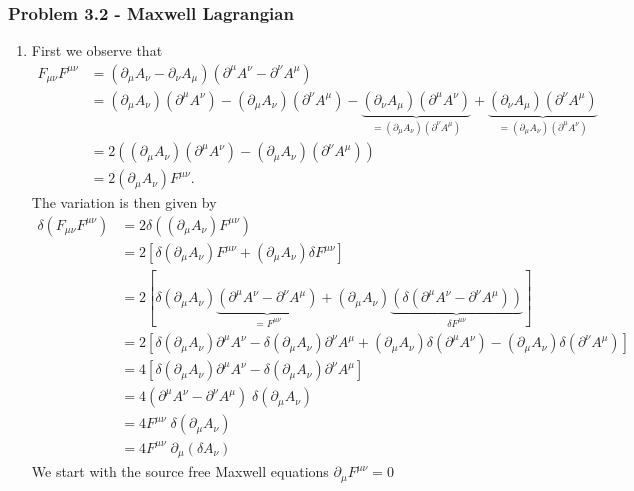 \documentclass[10pt,a4paper]{book}
\theoremstyle{definition}
\begin{document}
\subsubsection{Problem 3.2 - Maxwell Lagrangian}
\begin{enumerate}
    \item First we observe that
    \begin{align}
        F_{\mu\nu}F^{\mu\nu}
        &=(\partial_\mu A_\nu-\partial_\nu A_\mu)(\partial^\mu A^\nu-\partial^\nu A^\mu)\\
        &=(\partial_\mu A_\nu)(\partial^\mu A^\nu)-(\partial_\mu A_\nu)(\partial^\nu A^\mu)-\underbrace{(\partial_\nu A_\mu)(\partial^\mu A^\nu)}_{=(\partial_\mu A_\nu)(\partial^\nu A^\mu)}+\underbrace{(\partial_\nu A_\mu)(\partial^\nu A^\mu)}_{=(\partial_\mu A_\nu)(\partial^\mu A^\nu)}\\
        &=2\left((\partial_\mu A_\nu)(\partial^\mu A^\nu)-(\partial_\mu A_\nu)(\partial^\nu A^\mu)\right)\\
        &=2(\partial_\mu A_\nu)F^{\mu\nu}.
    \end{align}
    The variation is then given by
    \begin{align}
        \delta\left(F_{\mu\nu}F^{\mu\nu}\right)
        &=2\delta\left((\partial_\mu A_\nu)F^{\mu\nu}\right)\\
        &=2\left[\delta\left(\partial_\mu A_\nu\right)F^{\mu\nu}+(\partial_\mu A_\nu)\delta F^{\mu\nu}\right]\\
        &=2[\delta\left(\partial_\mu A_\nu\right)\underbrace{(\partial^\mu A^\nu-\partial^\nu A^\mu)}_{=F^{\mu\nu}}+(\partial_\mu A_\nu)\underbrace{\left(\delta(\partial^\mu A^\nu-\partial^\nu A^\mu)\right)}_{\delta F^{\mu\nu}}]\\
        &=2\left[\delta\left(\partial_\mu A_\nu\right)\partial^\mu A^\nu-\delta\left(\partial_\mu A_\nu\right)\partial^\nu A^\mu+(\partial_\mu A_\nu)\delta(\partial^\mu A^\nu)-(\partial_\mu A_\nu)\delta(\partial^\nu A^\mu) \right]\\
        &=4\left[\delta\left(\partial_\mu A_\nu\right)\partial^\mu A^\nu-\delta\left(\partial_\mu A_\nu\right)\partial^\nu A^\mu \right]\\
        &=4(\partial^\mu A^\nu-\partial^\nu A^\mu)\;\delta(\partial_\mu A_\nu)\\
        &=4F^{\mu\nu}\;\delta(\partial_\mu A_\nu)\\
        &=4F^{\mu\nu}\;\partial_\mu(\delta A_\nu)
    \end{align}
    We start with the source free Maxwell equations $\partial_\mu F^{\mu\nu}=0$

\end{enumerate}
\end{document}
